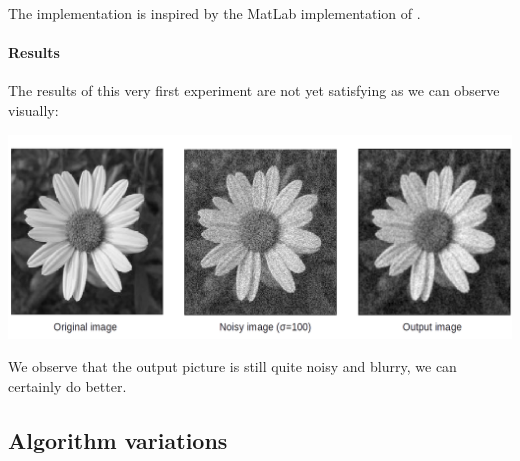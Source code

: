 The implementation is inspired by the MatLab implementation of \cite{glide_2014}.

\paragraph{Results}
The results of this very first experiment are not yet satisfying as we can observe visually:

\includegraphics[width=\textwidth]{img/firstimpl.png} %

We observe that the output picture is still quite noisy and blurry, we can certainly do better.

\subsection{Algorithm variations}


